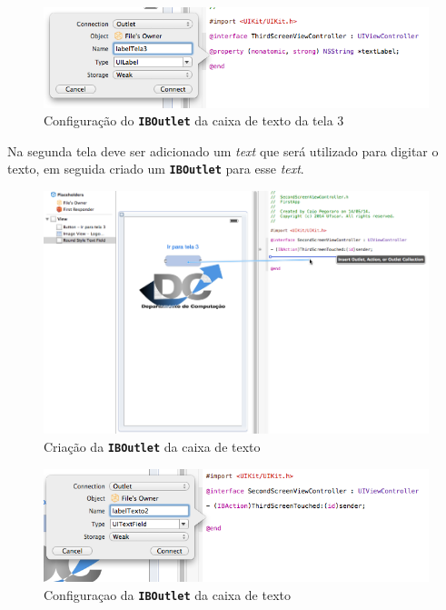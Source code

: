 \documentclass[a4paper,12pt,brazil,doubleside]{book}
\begin{document}
\begin{singlespace}
\begin{figure}[H]
  \centering
  \includegraphics[width=.75\textwidth]{figuras/3/tela_novo_projeto_46.png}
  \caption{Configuração do \texttt{\textbf{IBOutlet}} da caixa de texto da tela 3}
  \label{fig:a}
\end{figure} 
 

Na segunda tela deve ser adicionado um \emph{text} que será utilizado para digitar o texto, em seguida criado um \texttt{\textbf{IBOutlet}} para esse \emph{text}.

\begin{figure}[H]
  \centering
  \includegraphics[width=.99\textwidth]{figuras/3/tela_novo_projeto_42.png}
  \caption{Criação da \texttt{\textbf{IBOutlet}} da caixa de texto}
  \label{fig:a}
\end{figure} 

\begin{figure}[H]
  \centering
  \includegraphics[width=.75\textwidth]{figuras/3/tela_novo_projeto_43.png}
  \caption{Configuraçao da \texttt{\textbf{IBOutlet}} da caixa de texto}
  \label{fig:a}
\end{figure} 



\end{singlespace}
\end{document}
